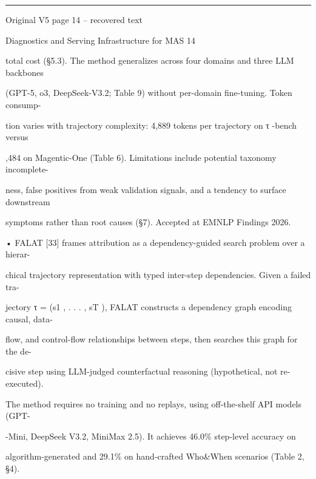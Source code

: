 \par\smallskip\noindent\rule{\textwidth}{0.4pt}\par{\sffamily\footnotesize Original V5 page 14 -- recovered text}\par\begin{flushleft}\footnotesize\ttfamily
\par\smallskip
\par\smallskip
\noindent Diagnostics and Serving Infrastructure for MAS 14\par
\par\smallskip
\par\smallskip
\par\smallskip
\noindent  total cost (§5.3). The method generalizes across four domains and three LLM backbones\par
\noindent  (GPT-5, o3, DeepSeek-V3.2; Table 9) without per-domain fine-tuning. Token consump-\par
\noindent  tion varies with trajectory complexity: 4,889 tokens per trajectory on τ -bench versus\par
{},484 on Magentic-One (Table 6). Limitations include potential taxonomy incomplete-\par
\noindent  ness, false positives from weak validation signals, and a tendency to surface downstream\par
\noindent  symptoms rather than root causes (§7). Accepted at EMNLP Findings 2026.\par
\noindent  • FALAT [33] frames attribution as a dependency-guided search problem over a hierar-\par
\noindent  chical trajectory representation with typed inter-step dependencies. Given a failed tra-\par
\noindent  jectory τ = (s1 , . . . , sT ), FALAT constructs a dependency graph encoding causal, data-\par
\noindent  flow, and control-flow relationships between steps, then searches this graph for the de-\par
\noindent  cisive step using LLM-judged counterfactual reasoning (hypothetical, not re-executed).\par
\noindent  The method requires no training and no replays, using off-the-shelf API models (GPT-\par
{}-Mini, DeepSeek V3.2, MiniMax 2.5). It achieves 46.0\% step-level accuracy on\par
\noindent  algorithm-generated and 29.1\% on hand-crafted Who\&When scenarios (Table 2, §4).\par

\end{flushleft}
